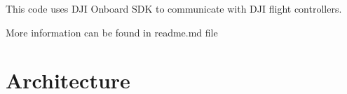 This code uses D\+JI Onboard S\+DK to communicate with D\+JI flight controllers.

More information can be found in readme.\+md file\hypertarget{index_Architecture}{}\section{Architecture}\label{index_Architecture}
   